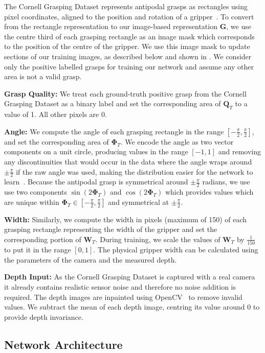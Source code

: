 \documentclass[conference]{IEEEtran}
\newcommand{\cG}{\mathbf{G}}
\newcommand{\cQ}{\mathbf{Q}}
\newcommand{\cW}{\mathbf{W}}
\newcommand{\bPhi}{\mathbf{\Phi}}
\begin{document}
The Cornell Grasping Dataset represents antipodal grasps as rectangles using pixel coordinates, aligned to the position and rotation of a gripper~\cite{Jiang2011EfficientRepresentation}.  To convert from the rectangle representation to our image-based representation $\cG$, we use the centre third of each grasping rectangle as an image mask which corresponds to the position of the centre of the gripper.  We use this image mask to update sections of our training images, as described below and shown in .  We consider only the positive labelled grasps for training our network and assume any other area is not a valid grasp.

\textbf{Grasp Quality:}  We treat each ground-truth positive grasp from the Cornell Grasping Dataset as a binary label and set the corresponding area of $\cQ_T$ to a value of 1. All other pixels are 0.

\textbf{Angle:} We compute the angle of each grasping rectangle in the range $[-\frac{\pi}{2},\frac{\pi}{2}]$, and set the corresponding area of $\bPhi_T$.  We encode the angle as two vector components on a unit circle, producing values in the range $[-1, 1]$ and removing any discontinuities that would occur in the data where the angle wraps around $\pm\frac{\pi}{2}$ if the raw angle was used, making the distribution easier for the network to learn~\cite{hara2017designing}.  
Because the antipodal grasp is symmetrical around $\pm\frac{\pi}{2}$ radians, we use use two components $\sin(2\bPhi_T)$ and $\cos(2\bPhi_T)$ which provides values which are unique within $\bPhi_T \in [-\frac{\pi}{2},\frac{\pi}{2}]$ and symmetrical at $\pm\frac{\pi}{2}$.

\textbf{Width:} Similarly, we compute the width in pixels (maximum of 150) of each grasping rectangle representing the width of the gripper and set the corresponding portion of $\cW_T$.  During training, we scale the values of $\cW_T$ by $\frac{1}{150}$ to put it in the range $[0, 1]$.  The physical gripper width can be calculated using the parameters of the camera and the measured depth.

\textbf{Depth Input:} As the Cornell Grasping Dataset is captured with a real camera it already contains realistic sensor noise and therefore no noise addition is required. The depth images are inpainted using OpenCV~\cite{opencv_library} to remove invalid values.  We subtract the mean of each depth image, centring its value around $0$ to provide depth invariance.

\subsection{Network Architecture}
\end{document}

